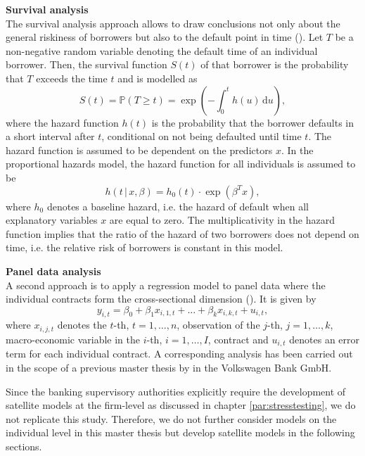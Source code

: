 \documentclass[a4paper, 12pt]{scrreprt}
\newcommand{\PP}{\mathbb{P}}
\begin{document}
\textbf{Survival analysis} \\
The survival analysis approach allows to draw conclusions not only about the general riskiness of borrowers but also to the default point in time (\textcite[chapter 1.7]{engelmann2011baselii}). Let $T$ be a non-negative random variable denoting the default time of an individual borrower. Then, the survival function $S(t)$ of that borrower is the probability that $T$ exceeds the time $t$ and is modelled as
\begin{equation}
S(t) = \PP(T \geq t) = \exp \left(-\int_0^t h(u) \, \mathrm{d}u \right),
\end{equation}
where the hazard function $h(t)$ is the probability that the borrower defaults in a short interval after $t$, conditional on not being defaulted until time $t$. 
The hazard function is assumed to be dependent on the predictors $x$. In the \textcite{cox1984survival} proportional hazards model, the hazard function for all individuals is assumed to be
\begin{equation}
h(t \, | \, x, \beta) = h_0(t) \cdot \exp (\beta^T x ),
\end{equation}
where $h_0$ denotes a baseline hazard, i.e. the hazard of default when all explanatory variables $x$ are equal to zero. 
The multiplicativity in the hazard function implies that the ratio of the hazard of two borrowers does not depend on time, i.e. the relative risk of borrowers is constant in this model. 

\bigskip

\textbf{Panel data analysis} \\
A second approach is to apply a regression model to panel data where the individual contracts form the cross-sectional dimension (\textcite[chapter 2]{baltagi2008panel}). 
It is given by 
\begin{equation}
y_{i,t} = \beta_0 + \beta_1 x_{i,1,t} + \ldots + \beta_k x_{i,k,t} + u_{i,t},
\end{equation}
where $x_{i,j,t}$ denotes the $t$-th, $t=1,\ldots,n$, observation of the $j$-th, $j=1,\ldots,k$, macro-economic variable in the $i$-th, $i=1,\ldots,I$, contract and $u_{i,t}$ denotes an error term for each individual contract.
A corresponding analysis has been carried out in the scope of a previous master thesis by \textcite{ivanchenko2017predicting} in the Volkswagen Bank GmbH. 

\bigskip

Since the banking supervisory authorities explicitly require the development of satellite models at the firm-level as discussed in chapter \ref{par:stresstesting}, we do not replicate this study. 
Therefore, we do not further consider models on the individual level in this master thesis but develop satellite models in the following sections.
\end{document}
